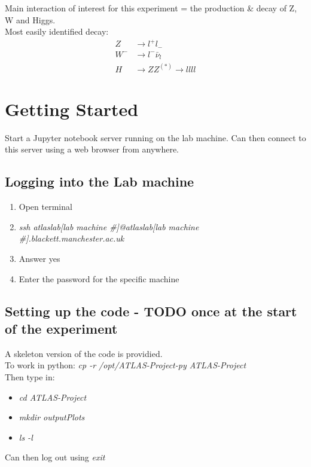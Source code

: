 \documentclass[11pt]{article}
\newcommand{\<}{\guilsinglleft}
\renewcommand{\>}{\guilsinglright}
\renewcommand{\it}[1]{\textit{#1}}
\begin{document}
    Main interaction of interest for this experiment = the production \& decay of Z, W and Higgs.\\
    Most easily identified decay:
    \begin{align}
        Z &\rightarrow l^+ l_-
        \\
        W^- &\rightarrow l^- \bar{\nu}_l
        \\
        H &\rightarrow ZZ^{(*)} \rightarrow llll
    \end{align}

    \section{Getting Started}
    Start a Jupyter notebook server running on the lab machine.
    Can then connect to this server using a web browser from anywhere.

    \subsection{Logging into the Lab machine}
    \begin{enumerate}
        \item Open terminal
        \item \it{ssh atlaslab[lab machine \#]@atlaslab[lab machine \#].blackett.manchester.ac.uk}
        \item Answer yes
        \item Enter the password for the specific machine
    \end{enumerate}

    \subsection{Setting up the code - TODO once at the start of the experiment}\label{subsec:setting-up-the-code}
    A skeleton version of the code is providied.\\
    To work in python: \it{cp -r /opt/ATLAS-Project-py ATLAS-Project}\\
    Then type in:\\
    \begin{itemize}
        \item \it{cd ATLAS-Project}
        \item \it{mkdir outputPlots}
        \item \it{ls -l}
    \end{itemize}
    Can then log out using \it{exit}
\end{document}
